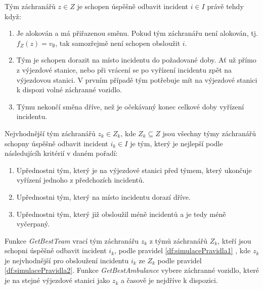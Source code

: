 \begin{definice}\label{df:simulacePravidla1}
  Tým záchranářů $z \in Z$ je schopen úspěšně odbavit incident $i \in I$ právě tehdy když:

  \begin{enumerate}
    \item
      Je alokován a má přiřazenou směnu. Pokud tým záchranářu není alokován, tj. $f_Z(z) = v_{\emptyset}$, tak samozřejmě není schopen obsloužit $i$.

    \item
      Tým je schopen dorazit na místo incidentu do požadované doby.
      Ať už přímo z výjezdové stanice, nebo při vrácení se po vyřízení incidentu zpět na výjezdovou stanici. 
      V prvním případě tým potřebuje mít na výjezdové stanici k dispozi volné záchranné vozidlo.

    \item
      Týmu nekončí směna dříve, než je očekávaný konec celkové doby vyřízení incidentu.
  \end{enumerate}
\end{definice}

\begin{definice}\label{df:simulacePravidla2}
  Nejvhodnější tým záchranářů $z_k \in Z_k$, kde $Z_k \subseteq Z$ jsou všechny týmy záchranářů schopny úspěšně odbavit incident $i_k \in I$ je tým,
  který je nejlepší podle následujícíh kritérií v daném pořadí:

  \begin{enumerate}
    \item Upřednostni tým, který je na výjezdové stanici před týmem, který ukončuje vyřízení jednoho z předchozích incidentů. 
    \item Upřednostni tým, který na místo incidentu dorazí dříve. 
    \item Upřednostni tým, který již obsloužil méně incidentů a je tedy méně vyčerpaný.
  \end{enumerate}
\end{definice}

Funkce \textit{GetBestTeam}\label{df:getBestTeam} vrací tým záchranářu $z_k$ z týmů záchranářů $Z_k$, kteří jsou schopni úspěšně odbavit incident $i_k$, podle pravidel \ref{df:simulacePravidla1}
, kde $z_k$ je nejvhodnější pro obsloužení incidentu $i_k$ ze $Z_k$ podle pravidel \ref{df:simulacePravidla2}. 
Funkce \textit{GetBestAmbulance}\label{df:getBestAmbulance} vybere záchranné vozidlo, které je na stejné výjezdové stanici jako $z_k$ a časově je nejdříve k dispozici.

